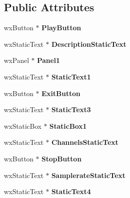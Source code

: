 \subsection*{Public Attributes}
\begin{DoxyCompactItemize}
\item 
\hypertarget{class_detail_dialog_abbe706e5374b5d84c9f5dfcee5712372}{wx\-Button $\ast$ {\bfseries Play\-Button}}\label{class_detail_dialog_abbe706e5374b5d84c9f5dfcee5712372}

\item 
\hypertarget{class_detail_dialog_a5d1e5dad94eeb3e768d4bd83a0d0fa58}{wx\-Static\-Text $\ast$ {\bfseries Description\-Static\-Text}}\label{class_detail_dialog_a5d1e5dad94eeb3e768d4bd83a0d0fa58}

\item 
\hypertarget{class_detail_dialog_a76a63ab17e950703a3c99e6ed36b1500}{wx\-Panel $\ast$ {\bfseries Panel1}}\label{class_detail_dialog_a76a63ab17e950703a3c99e6ed36b1500}

\item 
\hypertarget{class_detail_dialog_adfcb62c539f6f26f8e9f6674e08ac57e}{wx\-Static\-Text $\ast$ {\bfseries Static\-Text1}}\label{class_detail_dialog_adfcb62c539f6f26f8e9f6674e08ac57e}

\item 
\hypertarget{class_detail_dialog_ab8957eb1fd159c1e50c945b0ed99295c}{wx\-Button $\ast$ {\bfseries Exit\-Button}}\label{class_detail_dialog_ab8957eb1fd159c1e50c945b0ed99295c}

\item 
\hypertarget{class_detail_dialog_ad3a9ba29c509e8fdb9adf05df691cfb2}{wx\-Static\-Text $\ast$ {\bfseries Static\-Text3}}\label{class_detail_dialog_ad3a9ba29c509e8fdb9adf05df691cfb2}

\item 
\hypertarget{class_detail_dialog_ab63cadc52242ec0de074174a093be884}{wx\-Static\-Box $\ast$ {\bfseries Static\-Box1}}\label{class_detail_dialog_ab63cadc52242ec0de074174a093be884}

\item 
\hypertarget{class_detail_dialog_af5251d3b55705d40bed2e6204dae18a1}{wx\-Static\-Text $\ast$ {\bfseries Channels\-Static\-Text}}\label{class_detail_dialog_af5251d3b55705d40bed2e6204dae18a1}

\item 
\hypertarget{class_detail_dialog_a411a248198f8c1f5933e43126f7aba95}{wx\-Button $\ast$ {\bfseries Stop\-Button}}\label{class_detail_dialog_a411a248198f8c1f5933e43126f7aba95}

\item 
\hypertarget{class_detail_dialog_aa7af7eb32d948c195e51077f61b65d4c}{wx\-Static\-Text $\ast$ {\bfseries Samplerate\-Static\-Text}}\label{class_detail_dialog_aa7af7eb32d948c195e51077f61b65d4c}

\item 
\hypertarget{class_detail_dialog_aacb52a65130dc95e51d43fc144a679dd}{wx\-Static\-Text $\ast$ {\bfseries Static\-Text4}}\label{class_detail_dialog_aacb52a65130dc95e51d43fc144a679dd}

\end{DoxyCompactItemize}
